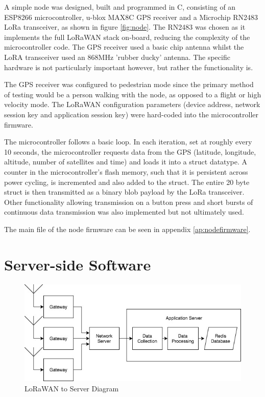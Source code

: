 \documentclass[a4paper]{report}
\begin{document}
    A simple node was designed, built and programmed in C, consisting of an ESP8266 microcontroller, u-blox MAX8C GPS receiver and a Microchip RN2483 LoRa transceiver, as shown in figure \ref{fig:node}. The RN2483 was chosen as it implements the full LoRaWAN stack on-board, reducing the complexity of the microcontroller code. The GPS receiver used a basic chip antenna whilst the LoRA transceiver used an 868MHz 'rubber ducky' antenna. The specific hardware is not particularly important however, but rather the functionality is.

    The GPS receiver was configured to pedestrian mode since the primary method of testing would be a person walking with the node, as opposed to a flight or high velocity mode. The LoRaWAN configuration parameters (device address, network session key and application session key) were hard-coded into the microcontroller firmware.

    The microcontroller follows a basic loop. In each iteration, set at roughly every 10 seconds, the microcontroller requests data from the GPS (latitude, longitude, altitude, number of satellites and time) and loads it into a struct datatype. A counter in the microcontroller's flash memory, such that it is persistent across power cycling, is incremented and also added to the struct. The entire 20 byte struct is then transmitted as a binary blob payload by the LoRa transceiver. Other functionality allowing transmission on a button press and short bursts of continuous data transmission was also implemented but not ultimately used.

    The main file of the node firmware can be seen in appendix \ref{ap:nodefirmware}.


  \section{Server-side Software}

    \begin{figure}
    \centering
    \includegraphics[width=12cm]{figures/server.jpeg}
    \caption{LoRaWAN to Server Diagram}
    \label{fig:server}
    \end{figure}
\end{document}
